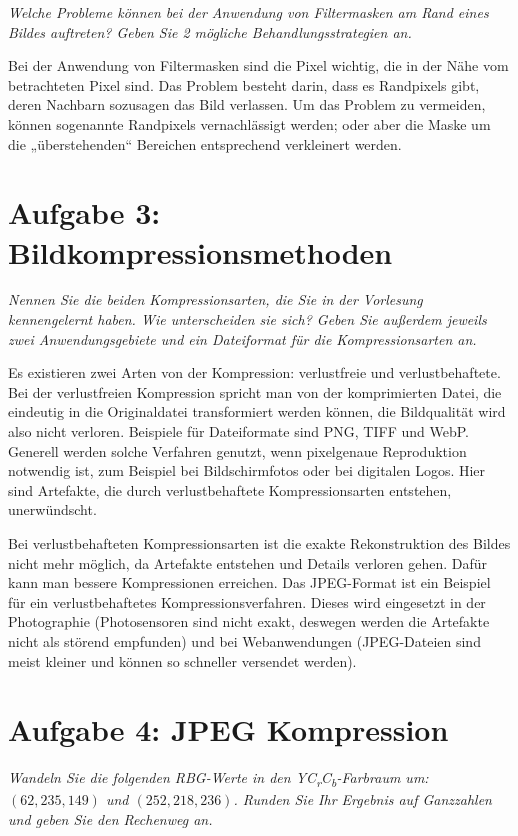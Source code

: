 \documentclass[
  ngerman,
  DIV=14
]{scrartcl}
\begin{document}
\emph{Welche Probleme können bei der Anwendung von Filtermasken am Rand eines Bildes auftreten? Geben Sie 2 mögliche Behandlungsstrategien an.}

Bei der Anwendung von Filtermasken sind die Pixel wichtig, die in der Nähe vom betrachteten Pixel sind. Das Problem besteht darin, dass es Randpixels gibt, deren Nachbarn sozusagen das Bild verlassen. Um das Problem zu vermeiden, können sogenannte Randpixels vernachlässigt werden; oder aber die Maske um die „überstehenden“ Bereichen entsprechend verkleinert werden.

\section*{Aufgabe 3: Bildkompressionsmethoden}

\emph{Nennen Sie die beiden Kompressionsarten, die Sie in der Vorlesung kennengelernt haben. Wie unterscheiden sie sich? Geben Sie außerdem jeweils zwei Anwendungsgebiete und ein Dateiformat für die Kompressionsarten an.}

Es existieren zwei Arten von der Kompression: verlustfreie und verlustbehaftete. Bei der verlustfreien Kompression spricht man von der komprimierten Datei, die eindeutig in die Originaldatei transformiert werden können, die Bildqualität wird also nicht verloren. Beispiele für Dateiformate sind PNG, TIFF und WebP. Generell werden solche Verfahren genutzt, wenn pixelgenaue Reproduktion notwendig ist,  zum Beispiel bei Bildschirmfotos oder bei digitalen Logos. Hier sind Artefakte, die durch verlustbehaftete Kompressionsarten entstehen, unerwündscht.

Bei verlustbehafteten Kompressionsarten ist die exakte Rekonstruktion des Bildes nicht mehr möglich, da Artefakte entstehen und Details verloren gehen. Dafür kann man bessere Kompressionen erreichen. Das JPEG-Format ist ein Beispiel für ein verlustbehaftetes Kompressionsverfahren. Dieses wird eingesetzt in der Photographie (Photosensoren sind nicht exakt, deswegen werden die Artefakte nicht als störend empfunden) und bei Webanwendungen (JPEG-Dateien sind meist kleiner und können so schneller versendet werden).

\section*{Aufgabe 4: JPEG Kompression}

\emph{Wandeln Sie die folgenden RBG-Werte in den YC\textsubscript{r}C\textsubscript{b}-Farbraum um: $(62,235,149)$ und $(252, 218, 236)$. Runden Sie Ihr Ergebnis auf Ganzzahlen und geben Sie den Rechenweg an.}
\end{document}
